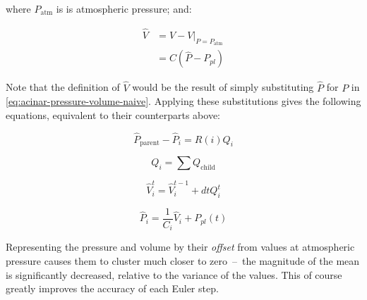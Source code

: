 \noindent
where $P_{\text{atm}}$ is is atmospheric pressure; and:

\begin{align}
    \hat{V} & = V - V \vert_{P = P_{\text{atm}}} \\
            & = C (\hat{P} - P_{pl})
\end{align}

\noindent
Note that the definition of $\hat{V}$ would be the result of simply substituting $\hat{P}$ for $P$
in \ref{eq:acinar-pressure-volume-naive}. Applying these substitutions gives the following
equations, equivalent to their counterparts above:

\begin{equation}
    \hat{P}_{\text{parent}} - \hat{P}_i = R(i) Q_i
\end{equation}

\begin{equation}
    Q_i = \sum Q_{\text{child}}
\end{equation}

\begin{equation}
    \hat{V}_i^t = \hat{V}_i^{t-1} + dt Q_i^t
\end{equation}

\begin{equation}
    \hat{P}_i = \frac{1}{C_i} \hat{V}_i + P_{pl}(t)
\end{equation}

Representing the pressure and volume by their \textit{offset} from values at atmospheric pressure
causes them to cluster much closer to zero~--~the magnitude of the mean is significantly decreased,
relative to the variance of the values. This of course greatly improves the accuracy of each Euler
step.
